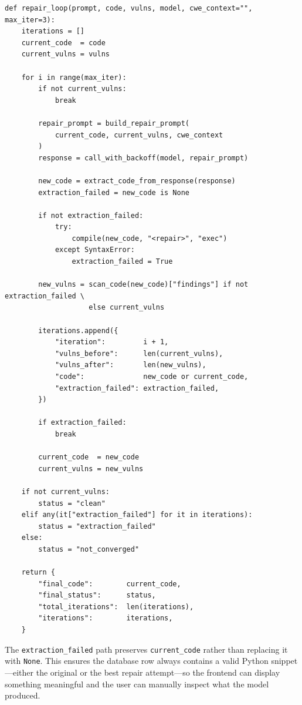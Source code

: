\documentclass[12pt,a4paper]{report}
\begin{document}
\begin{lstlisting}[caption={Core repair loop in \texttt{engine\_c\_repair.py}},
                   label={lst:repairloop}]
def repair_loop(prompt, code, vulns, model, cwe_context="", max_iter=3):
    iterations = []
    current_code  = code
    current_vulns = vulns

    for i in range(max_iter):
        if not current_vulns:
            break

        repair_prompt = build_repair_prompt(
            current_code, current_vulns, cwe_context
        )
        response = call_with_backoff(model, repair_prompt)

        new_code = extract_code_from_response(response)
        extraction_failed = new_code is None

        if not extraction_failed:
            try:
                compile(new_code, "<repair>", "exec")
            except SyntaxError:
                extraction_failed = True

        new_vulns = scan_code(new_code)["findings"] if not extraction_failed \
                    else current_vulns

        iterations.append({
            "iteration":         i + 1,
            "vulns_before":      len(current_vulns),
            "vulns_after":       len(new_vulns),
            "code":              new_code or current_code,
            "extraction_failed": extraction_failed,
        })

        if extraction_failed:
            break

        current_code  = new_code
        current_vulns = new_vulns

    if not current_vulns:
        status = "clean"
    elif any(it["extraction_failed"] for it in iterations):
        status = "extraction_failed"
    else:
        status = "not_converged"

    return {
        "final_code":        current_code,
        "final_status":      status,
        "total_iterations":  len(iterations),
        "iterations":        iterations,
    }
\end{lstlisting}

The \texttt{extraction\_failed} path preserves \texttt{current\_code} rather than
replacing it with \texttt{None}. This ensures the database row always contains a
valid Python snippet---either the original or the best repair attempt---so the
frontend can display something meaningful and the user can manually inspect what
the model produced.
\end{document}
